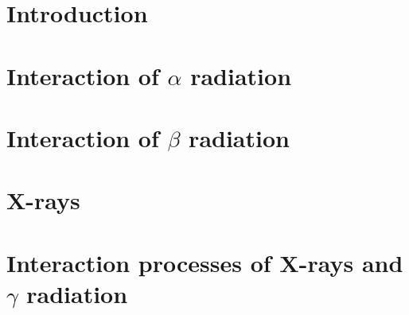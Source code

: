 \section{Introduction}
\section{Interaction of $\alpha$ radiation}
\section{Interaction of $\beta$ radiation}
\section{X-rays}
\section{Interaction processes of X-rays and $\gamma$ radiation}%
